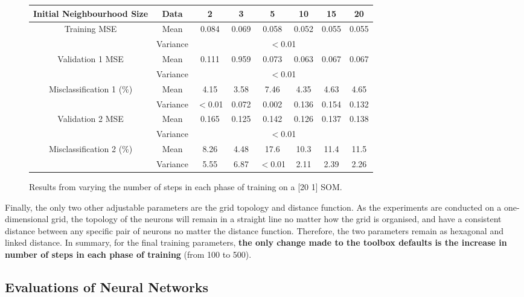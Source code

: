 \documentclass[10pt, oneside]{article}
\begin{document}
\begin{figure}[h]
\begin{center}
\fontsize{9}{11}\selectfont
\begin{tabular}{|*{8}{c|}}
\hline 
Initial Neighbourhood Size & Data & 2 & 3 & 5 & 10 & 15 & 20 \\ \hline
\multirow{2}{*}{Training MSE} & Mean & 0.084 & 0.069 & 0.058 & 0.052 & 0.055 & 0.055 \\ \cline{2-8}
\ & Variance & \multicolumn{6}{c|}{$<$0.01} \\ \hline
\multirow{2}{*}{Validation 1 MSE} & Mean & 0.111 & 0.959 & 0.073 & 0.063 & 0.067 & 0.067 \\ \cline{2-8}
\ & Variance & \multicolumn{6}{c|}{$<$0.01} \\ \hline
\multirow{2}{*}{Misclassification 1 (\%)} & Mean & 4.15 & 3.58 & 7.46 & 4.35 & 4.63 & 4.65 \\ \cline{2-8}
\ & Variance & $<$0.01 & 0.072 & 0.002 & 0.136 & 0.154 & 0.132 \\ \hline
\multirow{2}{*}{Validation 2 MSE} & Mean & 0.165 & 0.125 & 0.142 & 0.126 & 0.137 & 0.138 \\ \cline{2-8}
\ & Variance & \multicolumn{6}{c|}{$<$0.01} \\ \hline
\multirow{2}{*}{Misclassification 2 (\%)} & Mean & 8.26 & 4.48 & 17.6 & 10.3 & 11.4 & 11.5 \\ \cline{2-8}
\ & Variance & 5.55 & 6.87 & $<$0.01 & 2.11 & 2.39 & 2.26 \\ \hline
\end{tabular}
\end{center}
\caption{\label{fig:neighbourhood-testing} Results from varying the number of steps in each phase of training on a [20 1] SOM.}
\end{figure}

Finally, the only two other adjustable parameters are the grid topology and distance function. As the experiments are conducted on a one-dimensional grid, the topology of the neurons will remain in a straight line no matter how the grid is organised, and have a consistent distance between any specific pair of neurons no matter the distance function. Therefore, the two parameters remain as hexagonal and linked distance. In summary, for the final training parameters, \textbf{the only change made to the toolbox defaults is the increase in number of steps in each phase of training} (from 100 to 500).

\subsection{Evaluations of Neural Networks}
\end{document}
